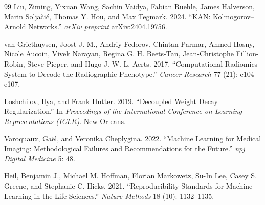 \documentclass[conference]{IEEEtran}
\begin{document}
\begin{thebibliography}{99}
Liu, Ziming, Yixuan Wang, Sachin Vaidya, Fabian Ruehle, James Halverson, Marin Solja\v{c}i\'{c}, Thomas Y. Hou, and Max Tegmark. 2024. ``KAN: Kolmogorov--Arnold Networks.'' \textit{arXiv preprint} arXiv:2404.19756.

van Griethuysen, Joost J. M., Andriy Fedorov, Chintan Parmar, Ahmed Hosny, Nicole Aucoin, Vivek Narayan, Regina G. H. Beets-Tan, Jean-Christophe Fillion-Robin, Steve Pieper, and Hugo J. W. L. Aerts. 2017. ``Computational Radiomics System to Decode the Radiographic Phenotype.'' \textit{Cancer Research} 77 (21): e104--e107.

Loshchilov, Ilya, and Frank Hutter. 2019. ``Decoupled Weight Decay Regularization.'' In \textit{Proceedings of the International Conference on Learning Representations (ICLR)}. New Orleans.

Varoquaux, Gaël, and Veronika Cheplygina. 2022. ``Machine Learning for Medical Imaging: Methodological Failures and Recommendations for the Future.'' \textit{npj Digital Medicine} 5: 48.

Heil, Benjamin J., Michael M. Hoffman, Florian Markowetz, Su-In Lee, Casey S. Greene, and Stephanie C. Hicks. 2021. ``Reproducibility Standards for Machine Learning in the Life Sciences.'' \textit{Nature Methods} 18 (10): 1132--1135.

\end{thebibliography}

\balance
\end{document}
